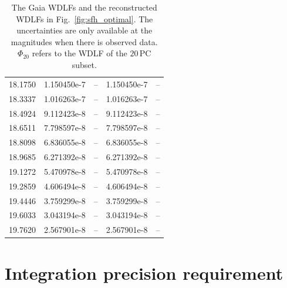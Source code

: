 \documentclass[fleqn,usenatbib]{mnras}
\begin{document}
\begin{table}
\begin{tabular}{c|cccc}
18.1750 & 1.150450e-7 & -- & 1.150450e-7 & --\\
18.3337 & 1.016263e-7 & -- & 1.016263e-7 & --\\\hline
18.4924 & 9.112423e-8 & -- & 9.112423e-8 & --\\
18.6511 & 7.798597e-8 & -- & 7.798597e-8 & --\\
18.8098 & 6.836055e-8 & -- & 6.836055e-8 & --\\
18.9685 & 6.271392e-8 & -- & 6.271392e-8 & --\\
19.1272 & 5.470978e-8 & -- & 5.470978e-8 & --\\
19.2859 & 4.606494e-8 & -- & 4.606494e-8 & --\\
19.4446 & 3.759299e-8 & -- & 3.759299e-8 & --\\
19.6033 & 3.043194e-8 & -- & 3.043194e-8 & --\\
19.7620 & 2.567901e-8 & -- & 2.567901e-8 & --\\\hline
    \end{tabular}
    \caption{The Gaia WDLFs and the reconstructed WDLFs in
    Fig.~\ref{fig:sfh_optimal}. The uncertainties are only available at the
    magnitudes when there is observed data. $\Phi_{20}$ refers to the WDLF of
    the $20$\,PC subset.}
    \label{tab:my_label}
\end{table}

\section{Integration precision requirement}
\label{appexdix:integration-precision}
\end{document}
